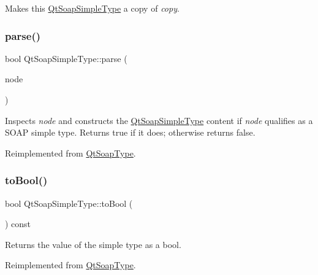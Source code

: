 Makes this \mbox{\hyperlink{class_qt_soap_simple_type}{Qt\+Soap\+Simple\+Type}} a copy of {\itshape copy}. \mbox{\label{class_qt_soap_simple_type_a936b78642e838a75198346786ba2eae5}} 
\subsubsection{\texorpdfstring{parse()}{parse()}}
{\footnotesize\ttfamily bool Qt\+Soap\+Simple\+Type\+::parse (\begin{DoxyParamCaption}\item[{Q\+Dom\+Node}]{node }\end{DoxyParamCaption})\hspace{0.3cm}{\ttfamily [virtual]}}

Inspects {\itshape node} and constructs the \mbox{\hyperlink{class_qt_soap_simple_type}{Qt\+Soap\+Simple\+Type}} content if {\itshape node} qualifies as a S\+O\+AP simple type. Returns true if it does; otherwise returns false. 

Reimplemented from \mbox{\hyperlink{class_qt_soap_type_a935516be4d70dda7e0f7fef889b1a2b8}{Qt\+Soap\+Type}}.

\mbox{\label{class_qt_soap_simple_type_ae66188ecb3501673471e4fa1a754ef33}} 
\subsubsection{\texorpdfstring{to\+Bool()}{toBool()}}
{\footnotesize\ttfamily bool Qt\+Soap\+Simple\+Type\+::to\+Bool (\begin{DoxyParamCaption}{ }\end{DoxyParamCaption}) const\hspace{0.3cm}{\ttfamily [virtual]}}

Returns the value of the simple type as a bool. 

Reimplemented from \mbox{\hyperlink{class_qt_soap_type_a39a2d84fd4458d82568c83489f66a01d}{Qt\+Soap\+Type}}.

\mbox{\label{class_qt_soap_simple_type_a85fb947fe3abe23c48a08a0d4f82604e}} 
